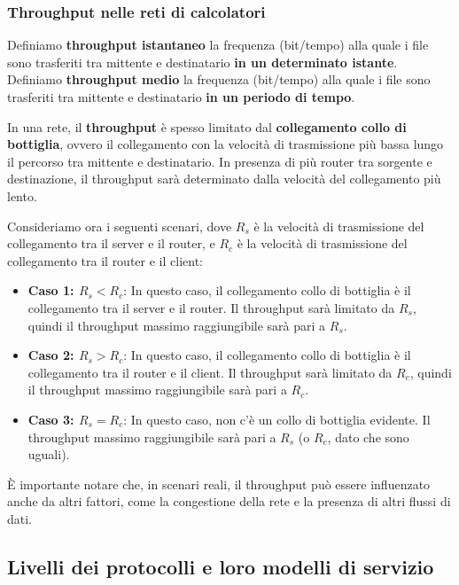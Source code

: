 \subsubsection{Throughput nelle reti di calcolatori}

Definiamo \textbf{throughput istantaneo} la frequenza (bit/tempo) alla quale i file sono trasferiti tra mittente e destinatario \textbf{in un determinato istante}. \\ 
Definiamo \textbf{throughput medio} la frequenza (bit/tempo) alla quale i file sono trasferiti tra mittente e destinatario \textbf{in un periodo di tempo}.

In una rete, il \textbf{throughput} è spesso limitato dal \textbf{collegamento collo di bottiglia}, ovvero il collegamento con la velocità di trasmissione più bassa lungo il percorso tra mittente e destinatario. In presenza di più router tra sorgente e destinazione, il throughput sarà determinato dalla velocità del collegamento più lento.

Consideriamo ora i seguenti scenari, dove $R_s$ è la velocità di trasmissione del collegamento tra il server e il router, e $R_c$ è la velocità di trasmissione del collegamento tra il router e il client:

\begin{itemize}
    \item \textbf{Caso 1: $R_s < R_c$}: In questo caso, il collegamento collo di bottiglia è il collegamento tra il server e il router. Il throughput sarà limitato da $R_s$, quindi il throughput massimo raggiungibile sarà pari a $R_s$.
    \item \textbf{Caso 2: $R_s > R_c$}: In questo caso, il collegamento collo di bottiglia è il collegamento tra il router e il client. Il throughput sarà limitato da $R_c$, quindi il throughput massimo raggiungibile sarà pari a $R_c$.
    \item \textbf{Caso 3: $R_s = R_c$}: In questo caso, non c'è un collo di bottiglia evidente. Il throughput massimo raggiungibile sarà pari a $R_s$ (o $R_c$, dato che sono uguali).
\end{itemize}

È importante notare che, in scenari reali, il throughput può essere influenzato anche da altri fattori, come la congestione della rete e la presenza di altri flussi di dati.

\subsection{Livelli dei protocolli e loro modelli di servizio}
